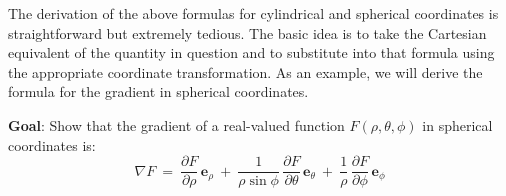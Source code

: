 \medskip
{}

\smallskip
The derivation of the above formulas for cylindrical and spherical coordinates is straightforward but extremely tedious.
The basic idea is to take the Cartesian equivalent of the quantity in question and to substitute into that
formula
using the appropriate coordinate transformation. As an example, we will derive the formula for the gradient in spherical
coordinates.


\par\noindent\textbf{Goal}: Show that the gradient of a real-valued function $F(\rho,\theta,\phi)$ in spherical
coordinates is:
\begin{displaymath}
 \nabla F ~=~ \frac{\partial F}{\partial \rho}\,\mathbf{e}_{\rho} ~+~
  \frac{1}{\rho \sin \phi}\,\frac{\partial F}{\partial \theta}\,\mathbf{e}_{\theta} ~+~
  \frac{1}{\rho}\,\frac{\partial F}{\partial \phi}\,\mathbf{e}_{\phi}
\end{displaymath}

